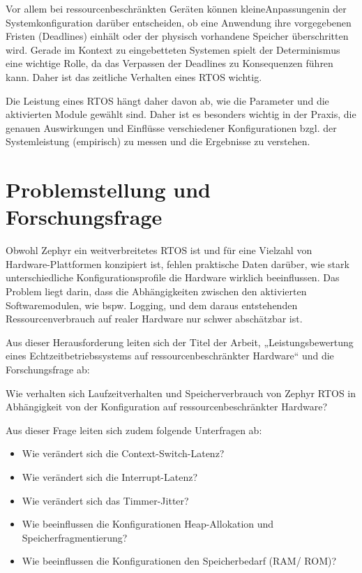 Vor allem bei ressourcenbeschränkten Geräten können kleineAnpassungenin der Systemkonfiguration darüber entscheiden, ob eine Anwendung ihre vorgegebenen Fristen (Deadlines) einhält oder der physisch vorhandene Speicher überschritten wird. Gerade im Kontext zu eingebetteten Systemen spielt der Determinismus eine wichtige Rolle, da das Verpassen der Deadlines zu Konsequenzen führen kann. Daher ist das zeitliche Verhalten eines RTOS wichtig.

Die Leistung eines RTOS hängt daher davon ab, wie die Parameter und die aktivierten Module gewählt sind. Daher ist es besonders wichtig in der Praxis, die genauen Auswirkungen und Einflüsse verschiedener Konfigurationen bzgl. der Systemleistung (empirisch) zu messen und die Ergebnisse zu verstehen.

\section{Problemstellung und Forschungsfrage}

Obwohl Zephyr ein weitverbreitetes RTOS ist und für eine Vielzahl von Hardware-Plattformen konzipiert ist, fehlen praktische Daten darüber, wie stark unterschiedliche Konfigurationsprofile die Hardware wirklich beeinflussen. Das Problem liegt darin, dass die Abhängigkeiten zwischen den aktivierten Softwaremodulen, wie bspw. Logging, und dem daraus entstehenden Ressourcenverbrauch auf realer Hardware nur schwer abschätzbar ist.

Aus dieser Herausforderung leiten sich der Titel der Arbeit, „Leistungsbewertung eines Echtzeitbetriebssystems auf ressourcenbeschränkter Hardware“ und die Forschungsfrage ab:

Wie verhalten sich Laufzeitverhalten und Speicherverbrauch von Zephyr RTOS in Abhängigkeit von der Konfiguration auf ressourcenbeschränkter Hardware?

Aus dieser Frage leiten sich zudem folgende Unterfragen ab:

\begin{itemize}
\item Wie verändert sich die Context-Switch-Latenz?
\item Wie verändert sich die Interrupt-Latenz?
\item Wie verändert sich das Timmer-Jitter?
\item Wie beeinflussen die Konfigurationen Heap-Allokation und Speicherfragmentierung?
\item Wie beeinflussen die Konfigurationen den Speicherbedarf (RAM/ ROM)?
\end{itemize}

